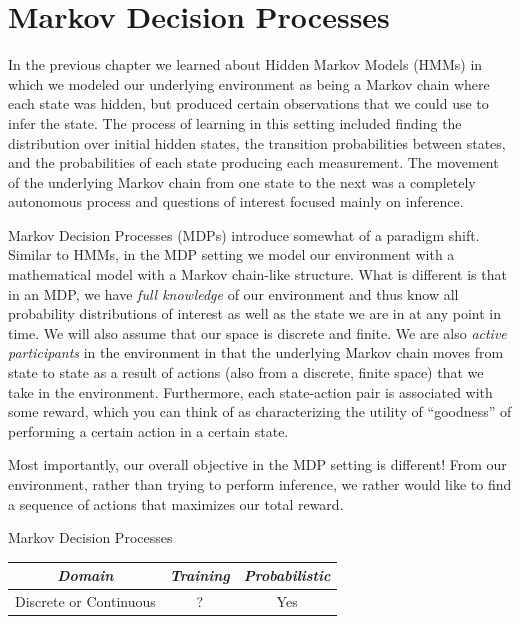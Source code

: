 \chapter{Markov Decision Processes}
In the previous chapter we learned about Hidden Markov Models (HMMs) in which we modeled our underlying environment as being a Markov chain where each state was hidden, but produced certain observations that we could use to infer the state. The process of learning in this setting included finding the distribution over initial hidden states, the transition probabilities between states, and the probabilities of each state producing each measurement. The movement of the underlying Markov chain from one state to the next was a completely autonomous process and questions of interest focused mainly on inference.

Markov Decision Processes (MDPs) introduce somewhat of a paradigm shift. Similar to HMMs, in the MDP setting we model our environment with a mathematical model with a Markov chain-like structure. What is different is that in an MDP, we have \textit{full knowledge} of our environment and thus know all probability distributions of interest as well as the state we are in at any point in time. We will also assume that our space is discrete and finite. We are also \textit{active participants} in the environment in that the underlying Markov chain moves from state to state as a result of actions (also from a discrete, finite space) that we take in the environment. Furthermore, each state-action pair is associated with some reward, which you can think of as characterizing the utility of ``goodness'' of performing a certain action in a certain state.

Most importantly, our overall objective in the MDP setting is different! From our environment, rather than trying to perform inference, we rather would like to find a sequence of actions that maximizes our total reward.\\

\begin{mlcube}{Markov Decision Processes}
\begin{center}
    \begin{tabular}{c|c|c}
    \textit{\textbf{Domain}} & \textit{\textbf{Training}} & \textit{\textbf{Probabilistic}} \\
    \hline
    Discrete or Continuous & ? & Yes \\
    \end{tabular}
\end{center}

\end{mlcube}

